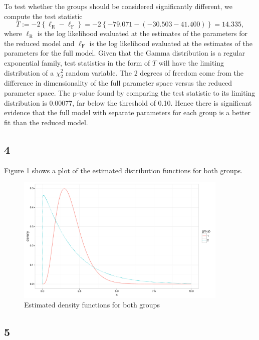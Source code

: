 \documentclass[12pt]{article}
\begin{document}
To test whether the groups should be considered significantly different, we compute the test statistic
\[
  T := -2\left\{ \ell_{\text{R}} - \ell_{\text{F}} \right\} = -2\left\{ -79.071 - (-30.503 - 41.400) \right\} = 14.335,
\]
where $\ell_{\text{R}}$ is the log likelihood evaluated at the estimates of the parameters for the reduced model and $\ell_{\text{F}}$ is the log likelihood evaluated
at the estimates of the parameters for the full model. Given that the Gamma distribution is a regular exponential family, test statistics in the form
of $T$ will have the limiting distribution of a $\chi_{2}^{2}$ random variable. The 2 degrees of freedom come from the difference in dimensionality of
the full parameter space versus the reduced parameter space. The p-value found by comparing the test statistic to its limiting distribution is 0.00077,
far below the threshold of 0.10. Hence there is significant evidence that the full model with separate parameters for each group is a better fit than
the reduced model.


\subsection*{4}

Figure 1 shows a plot of the estimated distribution functions for both groups.

\begin{figure}[!h]
  \caption{Estimated density functions for both groups}
  \centering
  \includegraphics[width=0.9\textwidth]{./figures/hw02_group.pdf}
\end{figure}


\subsection*{5}
\end{document}
